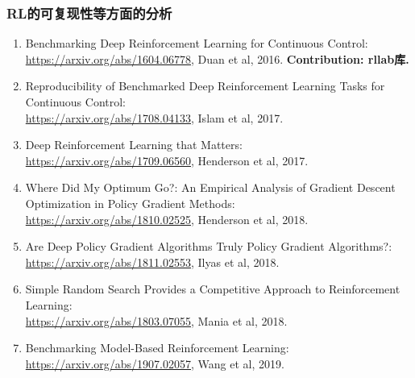 \documentclass[lang=cn,11pt,a4paper]{eleganttemplate}
\begin{document}
\subsubsection{RL的可复现性等方面的分析} 
\begin{enumerate}
\item Benchmarking Deep Reinforcement Learning for Continuous Control:\\ \href{https://arxiv.org/abs/1604.06778}{https://arxiv.org/abs/1604.06778}, Duan et al, 2016. \textbf{Contribution: rllab库.}
\item Reproducibility of Benchmarked Deep Reinforcement Learning Tasks for Continuous Control:\\ \href{https://arxiv.org/abs/1708.04133}{https://arxiv.org/abs/1708.04133}, Islam et al, 2017.
\item Deep Reinforcement Learning that Matters:\\ \href{https://arxiv.org/abs/1709.06560}{https://arxiv.org/abs/1709.06560}, Henderson et al, 2017.
\item Where Did My Optimum Go?: An Empirical Analysis of Gradient Descent Optimization in Policy Gradient Methods:\\ \href{https://arxiv.org/abs/1810.02525}{https://arxiv.org/abs/1810.02525}, Henderson et al, 2018.
\item Are Deep Policy Gradient Algorithms Truly Policy Gradient Algorithms?:\\ \href{https://arxiv.org/abs/1811.02553}{https://arxiv.org/abs/1811.02553}, Ilyas et al, 2018.
\item Simple Random Search Provides a Competitive Approach to Reinforcement Learning:\\ \href{https://arxiv.org/abs/1803.07055}{https://arxiv.org/abs/1803.07055}, Mania et al, 2018.
\item Benchmarking Model-Based Reinforcement Learning:\\ \href{https://arxiv.org/abs/1907.02057}{https://arxiv.org/abs/1907.02057}, Wang et al, 2019.
\end{enumerate}
\end{document}
